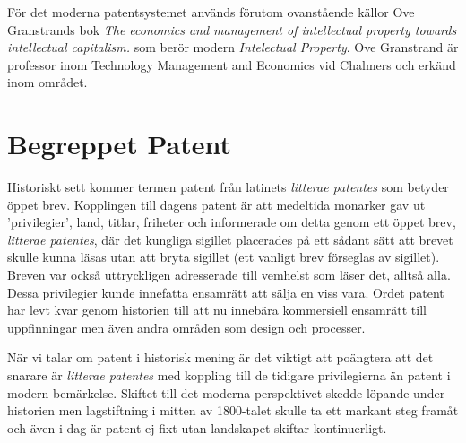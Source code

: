 För det moderna patentsystemet används förutom ovanstående källor Ove Granstrands bok
\emph{The economics and management of intellectual property towards intellectual capitalism.}\cite{ove}
som berör modern \emph{Intelectual Property}. Ove Granstrand är professor inom
Technology Management and Economics vid Chalmers och erkänd inom området.





\section{Begreppet Patent} %
\label{sec:lit}

Historiskt sett kommer termen patent från latinets \emph{litterae patentes} som
betyder öppet brev. Kopplingen till dagens patent är att medeltida monarker gav
ut 'privilegier', land, titlar, friheter och informerade om detta genom ett
öppet brev, \emph{litterae patentes}, där det kungliga sigillet placerades på
ett sådant sätt att brevet skulle kunna läsas utan att bryta sigillet\cite{blackstone} (ett vanligt brev förseglas av sigillet). Breven var också uttryckligen adresserade till 
vemhelst som läser det, alltså alla. Dessa privilegier kunde innefatta ensamrätt
att sälja en viss vara. Ordet patent har levt kvar genom historien till 
att nu innebära kommersiell ensamrätt till uppfinningar men även andra områden som design och processer. 

När vi talar om patent i historisk mening är det viktigt att poängtera att det 
snarare är \emph{litterae patentes} med koppling till de tidigare 
privilegierna än patent i modern bemärkelse. Skiftet till det moderna perspektivet skedde löpande under historien men lagstiftning i mitten av 1800-talet skulle ta ett markant steg framåt och även i dag är patent ej fixt utan landskapet skiftar kontinuerligt.
